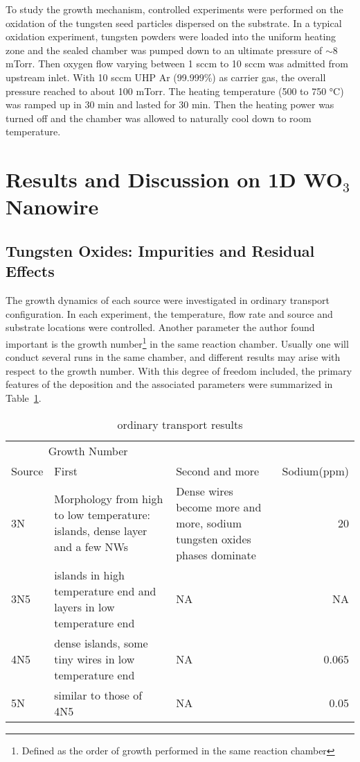 To study the growth mechanism, controlled experiments were performed on the oxidation of the tungsten seed particles dispersed on the substrate. In a typical oxidation experiment, tungsten powders were loaded into the uniform heating zone and the sealed chamber was pumped down to an ultimate pressure of $\sim8$ mTorr. Then oxygen flow varying between 1 sccm to 10 sccm was admitted from upstream inlet. With 10 sccm UHP Ar (99.999\%) as carrier gas, the overall pressure reached to about 100 mTorr. The heating temperature (500 to 750 \si{\degreeCelsius}) was ramped up in 30 min and lasted for 30 min. Then the heating power was turned off and the chamber was allowed to naturally cool down to room temperature.

\section{Results and Discussion on 1D WO$_3$ Nanowire}
\subsection{Tungsten Oxides: Impurities and Residual Effects}\label{sec:nawox}

The growth dynamics of each source were investigated in ordinary transport configuration. In each experiment, the temperature, flow rate and source and substrate locations were controlled. Another parameter the author found important is the growth number\footnote{Defined as the order of growth performed in the same reaction chamber} in the same reaction chamber. Usually one will conduct several runs in the same chamber, and different results may arise with respect to the growth number. With this degree of freedom included, the primary features of the deposition and the associated parameters were summarized in Table~\ref{tab:wot}.
\begin{table}[htb]
\centering
\caption{ ordinary transport results}\label{tab:wot}
\begin{tabular}{lp{2in}p{2in}r}
\toprule
\multicolumn{2}{c}{Growth Number} \\
\cmidrule(l){2-3}
 Source   & First & Second and more & Sodium(ppm)   \\
\midrule
3N      & Morphology from high to low temperature: islands, dense layer and a few NWs & Dense wires become more and more, sodium tungsten oxides phases dominate & 20  \\
3N5     & islands in high temperature end and layers in low temperature end & NA &      NA\\
4N5     & dense islands, some tiny wires in low temperature end & NA & 0.065 \\
5N      & similar to those of 4N5  & NA & 0.05\\
\bottomrule
\end{tabular}
\end{table}

